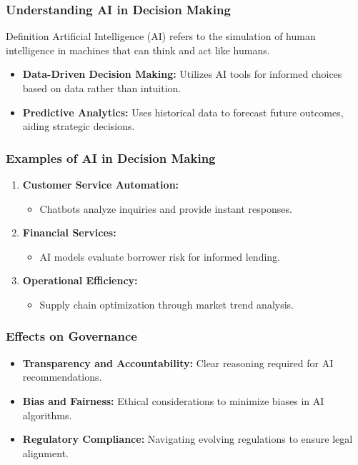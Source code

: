 \documentclass[aspectratio=169]{beamer}
\begin{document}
\begin{frame}[fragile]
    \frametitle{Understanding AI in Decision Making}
    \begin{block}{Definition}
        Artificial Intelligence (AI) refers to the simulation of human intelligence in machines that can think and act like humans.
    \end{block}
    \begin{itemize}
        \item \textbf{Data-Driven Decision Making:} Utilizes AI tools for informed choices based on data rather than intuition.
        \item \textbf{Predictive Analytics:} Uses historical data to forecast future outcomes, aiding strategic decisions.
    \end{itemize}
\end{frame}

\begin{frame}[fragile]
    \frametitle{Examples of AI in Decision Making}
    \begin{enumerate}
        \item \textbf{Customer Service Automation:}
            \begin{itemize}
                \item Chatbots analyze inquiries and provide instant responses.
            \end{itemize}
        
        \item \textbf{Financial Services:}
            \begin{itemize}
                \item AI models evaluate borrower risk for informed lending.
            \end{itemize}
        
        \item \textbf{Operational Efficiency:}
            \begin{itemize}
                \item Supply chain optimization through market trend analysis.
            \end{itemize}
    \end{enumerate}
\end{frame}

\begin{frame}[fragile]
    \frametitle{Effects on Governance}
    \begin{itemize}
        \item \textbf{Transparency and Accountability:} Clear reasoning required for AI recommendations.
        \item \textbf{Bias and Fairness:} Ethical considerations to minimize biases in AI algorithms.
        \item \textbf{Regulatory Compliance:} Navigating evolving regulations to ensure legal alignment.
    \end{itemize}
\end{frame}
\end{document}
